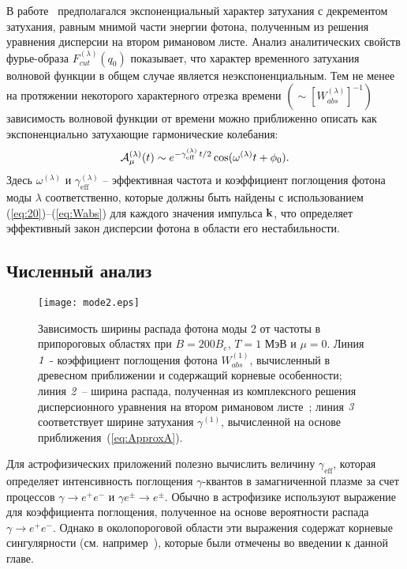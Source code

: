 В работе~\cite{Shabad:1988}
предполагался экспоненциальный характер затухания с декрементом затухания, равным мнимой части энергии фотона, полученным из решения уравнения дисперсии на втором римановом листе. Анализ  аналитических свойств фурье-образа $F^{(\lambda)}_{cut}(q_0)$ показывает, что характер временного затухания волновой функции в общем случае является неэкспоненциальным. Тем не менее на протяжении некоторого характерного отрезка времени $(\sim [W^{(\lambda)}_{abs}]^{-1})$
зависимость волновой функции от времени можно приближенно описать как 
экспоненциально затухающие гармонические колебания:
%
\begin{equation}\label{eq:ApproxA}
{\cal A}^{(\lambda)}_\mu(t) \sim e^{- \gamma^{(\lambda)}_\text{eff} \, t/2} \cos 
(\omega^{(\lambda)} t + \phi_0).
\end{equation}
%
Здесь $\omega^{(\lambda)}$ и $\gamma^{(\lambda)}_\text{eff}$ -- эффективная 
частота и коэффициент  
поглощения фотона моды $\lambda$ соответственно, которые должны быть найдены с использованием 
(\ref{eq:20})--(\ref{eq:Wabs}) для каждого значения импульса ${\bf k}$, что определяет эффективный 
закон дисперсии фотона в области его нестабильности.


\subsection{Численный анализ}


\begin{figure}[t]\centering
	\texttt{[image: mode2.eps]}
	\caption{\label{fig:fig2}Зависимость ширины распада фотона моды 2 от частоты в припороговых областях при $B=200 B_e$, $T=1$ МэВ и $ \mu=0 $. Линия $ {\it 1} $ - коэффициент поглощения фотона $ W ^ {(1)}_{abs} $,
		вычисленный в древесном приближении и содержащий корневые особенности; линия $ {\it 2} $ -- ширина распада, полученная из комплексного решения дисперсионного уравнения на втором римановом листе~\cite{Shabad:1988}; линия $ {\it 3} $ соответствует ширине затухания $ \gamma^{(1)}$, вычисленной на основе приближения~(\ref{eq:ApproxA}).}\label{fig:DampMode2}
\end{figure}

Для астрофизических приложений полезно вычислить величину $\gamma_\text{eff}$, которая определяет интенсивность поглощения 
$\gamma$-квантов в замагниченной плазме за счет  процессов $\gamma \to e^+ e^-$  и $\gamma e^{\pm} \to e^{\pm}$.
Обычно в астрофизике  используют выражение для коэффициента поглощения,
полученное на основе  вероятности распада  $ \gamma \to e^+ e^-$. Однако в околопороговой области эти выражения
содержат корневые сингулярности (см. например~\cite{HBG:1997}), которые были отмечены во введении к данной главе. 

